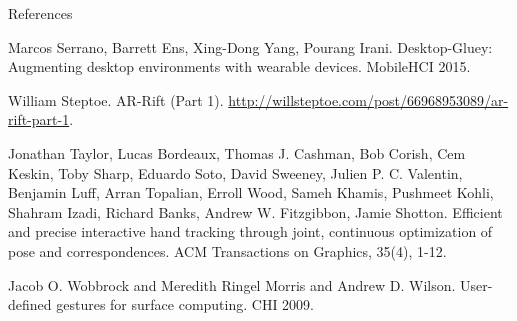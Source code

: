 \begin{frame}[allowframebreaks]{References}
\begin{thebibliography}{10}
      Marcos Serrano, Barrett Ens, Xing-Dong Yang, Pourang Irani.
      \newblock Desktop-Gluey: Augmenting desktop environments with wearable devices.
      \newblock MobileHCI 2015.

      William Steptoe.
      \newblock AR-Rift (Part 1).
      \newblock \url{http://willsteptoe.com/post/66968953089/ar-rift-part-1}.

      Jonathan Taylor, Lucas Bordeaux, Thomas J. Cashman, Bob Corish, Cem Keskin, Toby Sharp, Eduardo Soto, David Sweeney, Julien P. C. Valentin, Benjamin Luff, Arran Topalian, Erroll Wood, Sameh Khamis, Pushmeet Kohli, Shahram Izadi, Richard Banks, Andrew W. Fitzgibbon, Jamie Shotton.
      \newblock Efficient and precise interactive hand tracking through joint, continuous optimization of pose and correspondences.
      \newblock ACM Transactions on Graphics, 35(4), 1-12.

      Jacob O. Wobbrock and Meredith Ringel Morris and Andrew D. Wilson.
      \newblock User-defined gestures for surface computing.
      \newblock CHI 2009.
  \end{thebibliography}
\end{frame}